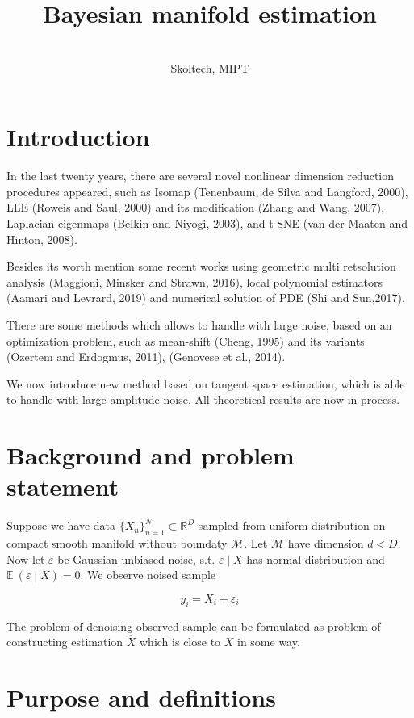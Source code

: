 \documentclass[tablecaption=bottom,wcp]{jmlr} %
\title[Bayesian manifold estimation]{Bayesian manifold estimation}
\author{\Name{Busovikov Vladimir}\\
  \addr Skoltech, MIPT}
\begin{document}
\maketitle


\section{Introduction}

In the last twenty years, there are  several novel nonlinear dimension reduction procedures appeared, such
as Isomap (Tenenbaum, de Silva and Langford, 2000), LLE (Roweis and Saul, 2000) and its modification (Zhang and Wang, 2007), Laplacian eigenmaps (Belkin and Niyogi, 2003), and t-SNE (van der Maaten and Hinton, 2008).

Besides its worth mention some recent works using  geometric multi retsolution analysis (Maggioni, Minsker and Strawn, 2016), local polynomial estimators (Aamari and Levrard, 2019) and numerical solution of PDE (Shi and Sun,2017).


There are some methods which allows to handle with large noise, based on an optimization problem, such as mean-shift (Cheng, 1995) and its variants (Ozertem and Erdogmus, 2011), (Genovese et al., 2014).

We now introduce new method based on tangent space estimation, which is able to handle with large-amplitude noise. All theoretical results are now in process.


\section{Background and problem statement}

Suppose we have data $\{X_n\}_{n=1}^N \subset \mathbb{R}^D$ sampled from uniform distribution on compact smooth manifold without boundaty $\mathcal{M}$. Let $\mathcal{M}$ have dimension $d < D$. Now let $\varepsilon$ be Gaussian unbiased noise, s.t. $\varepsilon \mid X$ has normal distribution and $\mathbb{E} \ (\varepsilon \mid X) = 0$. We observe noised sample

$$ y_i = X_i + \varepsilon_i$$

The problem of denoising observed sample can be formulated as problem of constructing estimation $\hat X$ which is close to $X$ in some way.

\section{Purpose and definitions}
\end{document}
